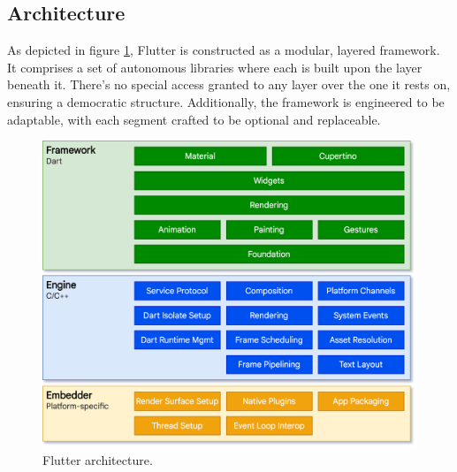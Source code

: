 \subsection{Architecture}
As depicted in figure \ref{fig:3_flutter_architecture}, Flutter is constructed as a modular, layered
framework. It comprises a set of autonomous libraries where each is built upon the layer beneath it.
There's no special access granted to any layer over the one it rests on, ensuring a democratic
structure. Additionally, the framework is engineered to be adaptable, with each segment crafted to
be optional and replaceable.

\begin{figure}
    \centering
    \includegraphics[scale=0.2]{Pictures/3_flutter.png}
    \caption{Flutter architecture.}
    \label{fig:3_flutter_architecture}
\end{figure}

